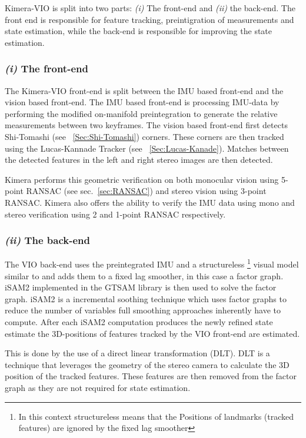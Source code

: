 \documentclass[11pt,a4paper]{article}
\begin{document}
Kimera-VIO is split into two parts: \textit{(i)} The front-end and \textit{(ii)} the back-end. 
The front end is responsible for feature tracking, preintigration of measurements and state estimation, while the back-end is responsible for improving the state estimation. 
\subsubsection*{\textit{(i)} The front-end}\label{para:geometric verification} 

The Kimera-VIO front-end is split between the IMU based front-end and the vision based front-end.
The IMU based front-end is processing IMU-data by performing the modified on-manifold preintegration to generate the relative measurements between two keyframes. 
The vision based front-end first detects Shi-Tomashi (see ~\ref{Sec:Shi-Tomashi}) corners. 
These corners are then tracked using the Lucas-Kannade Tracker \cite{lucas1981iterative} (see ~\ref{Sec:Lucas-Kanade}). 
Matches between the detected features in the left and right stereo images are then detected.  

Kimera performs this geometric verification on both monocular vision using 5-point RANSAC (see sec.~\ref{sec:RANSAC}) and stereo vision using 3-point RANSAC.
Kimera also offers the ability to verify the IMU data using mono and stereo verification using 2 and 1-point RANSAC respectively.

\subsubsection*{\textit{(ii)} The back-end}
The VIO back-end uses the preintegrated IMU and a structureless \footnote{In this context structureless means that the Positions of landmarks (tracked features) are ignored by the fixed lag smoother} visual model similar to \cite{Forster_2017} and adds them to a fixed lag smoother, in this case a factor graph. 
iSAM2 implemented in the GTSAM library is then used to solve the factor graph. 
iSAM2 is a incremental soothing technique which uses factor graphs to reduce the number of variables full smoothing approaches inherently have to compute. 
After each iSAM2 computation produces the newly refined state estimate the 3D-positions of features tracked by the VIO front-end are estimated.

This is done by the use of a direct linear transformation (DLT). 
DLT is a technique that leverages the geometry of the stereo camera to calculate the 3D position of the tracked features.
These features are then removed from the factor graph as they are not required for state estimation.
\end{document}
